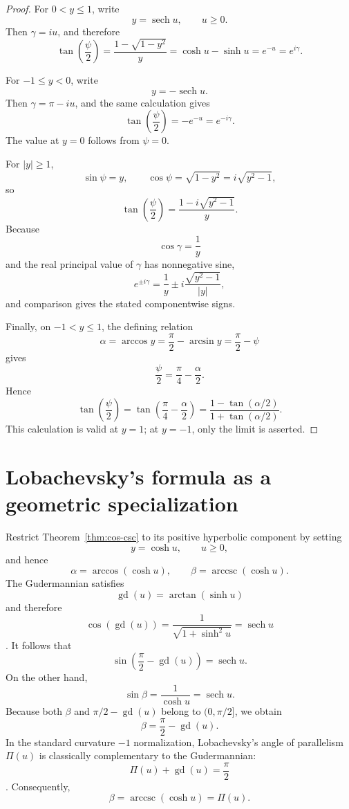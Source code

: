 \documentclass[11pt]{article}
\theoremstyle{remark}
\DeclareMathOperator{\arccsc}{arccsc}
\DeclareMathOperator{\sech}{sech}
\DeclareMathOperator{\gd}{gd}
\begin{document}
\begin{proof}
For \(0<y\le1\), write
\[
y=\sech u,
\qquad
u\ge0.
\]
Then \(\gamma=iu\), and therefore
\[
\tan\!\left(\frac{\psi}{2}\right)
=\frac{1-\sqrt{1-y^2}}{y}
=\cosh u-\sinh u
=e^{-u}
=e^{i\gamma}.
\]

For \(-1\le y<0\), write
\[
y=-\sech u.
\]
Then \(\gamma=\pi-iu\), and the same calculation gives
\[
\tan\!\left(\frac{\psi}{2}\right)
=-e^{-u}
=e^{-i\gamma}.
\]
The value at \(y=0\) follows from \(\psi=0\).

For \(|y|\ge1\),
\[
\sin\psi=y,
\qquad
\cos\psi=\sqrt{1-y^2}
=i\sqrt{y^2-1},
\]
so
\[
\tan\!\left(\frac{\psi}{2}\right)
=\frac{1-i\sqrt{y^2-1}}{y}.
\]
Because
\[
\cos\gamma=\frac{1}{y}
\]
and the real principal value of \(\gamma\) has nonnegative sine,
\[
e^{\pm i\gamma}
=\frac{1}{y}
 \pm i\frac{\sqrt{y^2-1}}{|y|},
\]
and comparison gives the stated componentwise signs.

Finally, on \(-1<y\le1\), the defining relation
\[
\alpha=\arccos y=\frac{\pi}{2}-\arcsin y=\frac{\pi}{2}-\psi
\]
gives
\[
\frac{\psi}{2}=\frac{\pi}{4}-\frac{\alpha}{2}.
\]
Hence
\[
\tan\!\left(\frac{\psi}{2}\right)
=\tan\!\left(\frac{\pi}{4}-\frac{\alpha}{2}\right)
=\frac{1-\tan(\alpha/2)}
     {1+\tan(\alpha/2)}.
\]
This calculation is valid at \(y=1\); at \(y=-1\), only the limit is
asserted.
\end{proof}

\section{Lobachevsky's formula as a geometric specialization}
\label{sec:lobachevsky}

Restrict Theorem~\ref{thm:cos-csc} to its positive hyperbolic component by setting
\[
y=\cosh u,
\qquad u\ge0,
\]
and hence
\[
\alpha=\arccos(\cosh u),
\qquad
\beta=\arccsc(\cosh u).
\]
The Gudermannian satisfies
\[
\gd(u)=\arctan(\sinh u)
\]
and therefore
\[
\cos(\gd(u))=\frac{1}{\sqrt{1+\sinh^2u}}=\sech u
\]
\cite[\S4.23(viii)]{DLMF}. It follows that
\[
\sin\!\left(\frac{\pi}{2}-\gd(u)\right)=\sech u.
\]
On the other hand,
\[
\sin\beta=\frac{1}{\cosh u}=\sech u.
\]
Because both $\beta$ and $\pi/2-\gd(u)$ belong to $(0,\pi/2]$, we obtain
\[
\beta=\frac{\pi}{2}-\gd(u).
\]
In the standard curvature $-1$ normalization, Lobachevsky's angle of parallelism $\Pi(u)$ is classically complementary to the Gudermannian:
\[
\Pi(u)+\gd(u)=\frac{\pi}{2}
\]
\cite[\S16.3]{Coxeter}. Consequently,
\[
\beta=\arccsc(\cosh u)=\Pi(u).
\]
\end{document}
